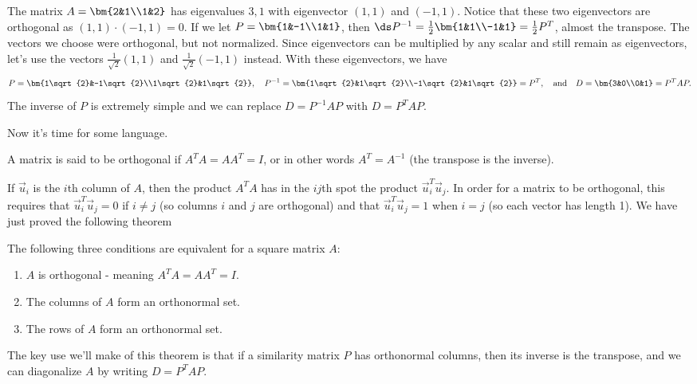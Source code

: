 \begin{example}
The matrix $A = \bm {2&1\\1&2}$ has eigenvalues $3,1$ with eigenvector $(1,1)$ and $(-1,1)$. 
Notice that these two eigenvectors are orthogonal as $(1,1)\cdot(-1,1)=0$. 
If we let $P = \bm{1&-1\\1&1}$, then $\ds P^{-1} = \frac{1}{2}\bm{1&1\\-1&1} = \frac{1}{2}P^T$, almost the transpose.
The vectors we choose were orthogonal, but not normalized. Since eigenvectors can be multiplied by any scalar and still remain as eigenvectors, let's use the vectors $\frac{1}{\sqrt{2}}(1,1)$ and $\frac{1}{\sqrt{2}}(-1,1)$ instead. With these eigenvectors, we have 
$$P = \bm{1\sqrt{2}&-1\sqrt{2}\\1\sqrt{2}&1\sqrt{2}}, \quad P^{-1} = \bm{1\sqrt{2}&1\sqrt{2}\\-1\sqrt{2}&1\sqrt{2}} = P^T,\quad
\text{and}\quad D = \bm{3&0\\0&1} = P^T A P.$$ 
The inverse of $P$ is extremely simple and we can replace $D=P^{-1}AP$ with $D=P^T A P$.  
\end{example}

Now it's time for some language.
\begin{definition}
A matrix is said to be orthogonal if $A^TA=AA^T=I$, or in other words $A^T=A^{-1}$ (the transpose is the inverse).  
\end{definition}
 If $\vec u_i$ is the $i$th column of $A$, then the product $A^TA$ has in  the $ij$th spot the product $\vec u_i^T \vec u_j$.  In order for a matrix to be orthogonal, this requires that $\vec u_i^T \vec u_j=0$ if $i\neq j$ (so columns $i$ and $j$ are orthogonal) and that $\vec u_i^T \vec u_j=1$ when $i=j$ (so each vector has length 1).  We have just proved the following theorem
\begin{theorem}
The following three conditions are equivalent for a square matrix $A$:
\begin{enumerate}
	\item $A$ is orthogonal - meaning $A^TA=AA^T=I$.
	\item The columns of $A$ form an orthonormal set.
	\item The rows of $A$ form an orthonormal set.
\end{enumerate}
\end{theorem}
The key use we'll make of this theorem is that if a similarity matrix $P$ has orthonormal columns, then its inverse is the transpose, and we can diagonalize $A$ by writing $D=P^TAP$. 

